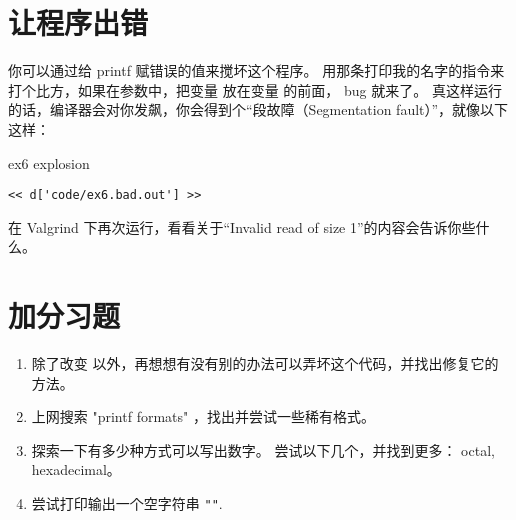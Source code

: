 \section{让程序出错}

你可以通过给 printf 赋错误的值来搅坏这个程序。 用那条打印我的名字的指令来打个比方，如果在参数中，把变量  放在变量  的前面， bug 就来了。 真这样运行的话，编译器会对你发飙，你会得到个“段故障（Segmentation fault）”，就像以下这样：

\begin{code}{ex6 explosion}
\begin{lstlisting}
<< d['code/ex6.bad.out'] >>
\end{lstlisting}
\end{code}

在 Valgrind 下再次运行，看看关于“Invalid read of size 1”的内容会告诉你些什么。


\section{加分习题}

\begin{enumerate}
\item 除了改变  以外，再想想有没有别的办法可以弄坏这个代码，并找出修复它的方法。
\item 上网搜索 "printf formats" ，找出并尝试一些稀有格式。
\item 探索一下有多少种方式可以写出数字。 尝试以下几个，并找到更多： octal, hexadecimal。
\item 尝试打印输出一个空字符串 \verb|""|.
\end{enumerate}

